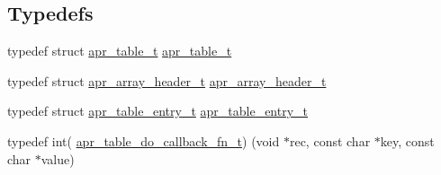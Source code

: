 \subsection*{Typedefs}
\begin{DoxyCompactItemize}
\item 
typedef struct \hyperlink{group__apr__tables_gad7ea82d6608a4a633fc3775694ab71e4}{apr\+\_\+table\+\_\+t} \hyperlink{group__apr__tables_gad7ea82d6608a4a633fc3775694ab71e4}{apr\+\_\+table\+\_\+t}
\item 
typedef struct \hyperlink{structapr__array__header__t}{apr\+\_\+array\+\_\+header\+\_\+t} \hyperlink{group__apr__tables_ga63e76617a1cd3828bbaefcbf93928ec2}{apr\+\_\+array\+\_\+header\+\_\+t}
\item 
typedef struct \hyperlink{structapr__table__entry__t}{apr\+\_\+table\+\_\+entry\+\_\+t} \hyperlink{group__apr__tables_gac7e0151b714e58b75c597dafed75df3f}{apr\+\_\+table\+\_\+entry\+\_\+t}
\item 
typedef int( \hyperlink{group__apr__tables_gabac50c7b2bae5f8cef6245d1959f8b06}{apr\+\_\+table\+\_\+do\+\_\+callback\+\_\+fn\+\_\+t}) (void $\ast$rec, const char $\ast$key, const char $\ast$value)
\end{DoxyCompactItemize}
